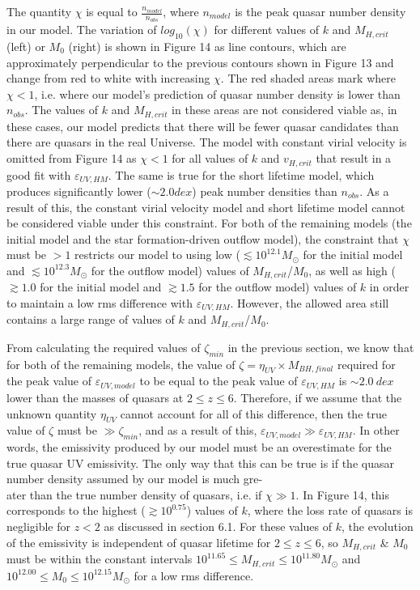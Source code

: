 \documentclass[12pt]{article}%
\begin{document}
The quantity $\chi$ is equal to $\frac{n_{model}}{n_{obs}}$, where $n_{model}$ is the peak quasar number density in our model. The variation of $log_{10}(\chi)$ for different values of $k$ and $M_{H,crit}$ (left) or $M_0$ (right) is shown in Figure 14 as line contours, which are approximately perpendicular to the previous contours shown in Figure 13 and change from red to white with increasing $\chi$. The red shaded areas mark where $\chi<1$, i.e. where our model's prediction of quasar number density is lower than $n_{obs}$. The values of $k$ and $M_{H,crit}$ in these areas are not considered viable as, in these cases, our model predicts that there will be fewer quasar candidates than there are quasars in the real Universe. The model with constant virial velocity is omitted from Figure 14 as $\chi<1$ for all values of $k$ and $v_{H,crit}$ that result in a good fit with $\varepsilon_{UV,HM}$. The same is true for the short lifetime model, which produces significantly lower ($\sim2.0dex$) peak number densities than $n_{obs}$. As a result of this, the constant virial velocity model and short lifetime model cannot be considered viable under this constraint. For both of the remaining models (the initial model and the star formation-driven outflow model), the constraint that $\chi$ must be $>1$ restricts our model to using low ($\lesssim10^{12.1}M_\odot$ for the initial model and $\lesssim10^{12.3}M_\odot$ for the outflow model) values of $M_{H,crit}$/$M_0$, as well as high ($\gtrsim1.0$ for the initial model and $\gtrsim1.5$ for the outflow model) values of $k$ in order to maintain a low rms difference with $\varepsilon_{UV,HM}$. However, the allowed area still contains a large range of values of $k$ and $M_{H,crit}$/$M_0$.\par

From calculating the required values of $\zeta_{min}$ in the previous section, we know that for both of the remaining models, the value of $\zeta=\eta_{UV}\times M_{BH,final}$ required for the peak value of $\varepsilon_{UV,model}$ to be equal to the peak value of $\varepsilon_{UV,HM}$ is $\sim2.0\:dex$ lower than the masses of quasars at $2\leq z\leq6$. Therefore, if we assume that the unknown quantity $\eta_{UV}$ cannot account for all of this difference, then the true value of $\zeta$ must be $\gg\zeta_{min}$, and as a result of this, $\varepsilon_{UV,model}\gg\varepsilon_{UV,HM}$. In other words, the emissivity produced by our model must be an overestimate for the true quasar UV emissivity. The only way that this can be true is if the quasar number density assumed by our model is much gre-\\ater than the true number density of quasars, i.e. if $\chi\gg1$. In Figure 14, this corresponds to the highest ($\gtrsim10^{0.75}$) values of $k$, where the loss rate of quasars is negligible for $z<2$ as discussed in section 6.1. For these values of $k$, the evolution of the emissivity is independent of quasar lifetime for $2\leq z\leq6$, so $M_{H,crit}$ \& $M_0$ must be within the constant intervals $10^{11.65}\leq M_{H,crit}\leq10^{11.80}M_\odot$ and $10^{12.00}\leq M_0\leq10^{12.15}M_\odot$ for a low rms difference.
\end{document}
